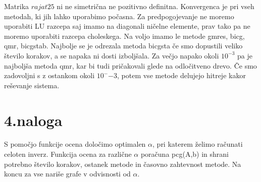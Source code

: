 \documentclass[11pt]{article} %
\begin{document}
Matrika $rajat25$ ni ne simetrična ne pozitivno definitna. Konvergenca je pri vseh metodah, ki jih lahko uporabimo počasna. Za predpogojevanje ne moremo uporabiti LU razcepa saj imamo na diagonali ničelne elemente, prav tako pa ne moremo uporabiti razcepa choleskega.  Na voljo imamo le metode gmres, bicg, qmr, bicgstab. Najbolje se je odrezala metoda bicgsta če smo dopustili veliko število korakov, a se napaka ni dosti izboljšala. Za večjo napako okoli $10^{-3}$ pa je najboljša metoda qmr, kar bi tudi pričakovali glede na odločitveno drevo. Če smo zadovoljni s z ostankom okoli $10^-{-3}$, potem vse metode delujejo hitreje kakor reševanje sistema.

\section{4.naloga}

S pomočjo funkcije ocena določimo optimalen $\alpha$, pri katerem želimo računati celoten inverz. Funkcija ocena za različne $\alpha$  poračuna pcg(A,b) in shrani potrebno število korakov, ostanek metode in časovno zahtevnost metode. Na koncu za vse nariše grafe v odvisnosti od $\alpha$. 
\end{document}
